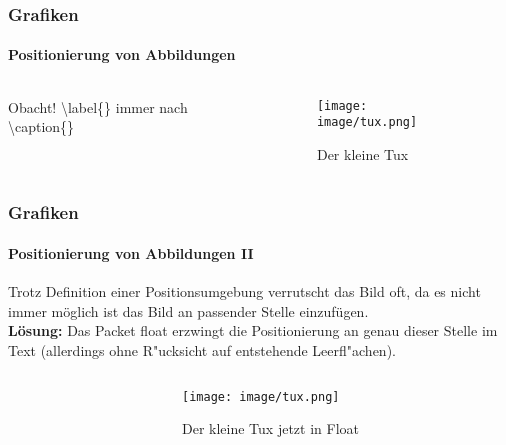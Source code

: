 
\begin{frame}
\frametitle{Grafiken}
\framesubtitle{Positionierung von Abbildungen}
\begin{columns}
\begin{column}{.5\textwidth}
{\ttfamily {\footnotesize
}}

\begin{alertblock}{Obacht!}
\color{nounibaredI}\textbackslash label\color{black}\{\} immer nach \color{nounibaredI}\textbackslash caption\color{black}\{\}
\end{alertblock}
\end{column}

\begin{column}{.5\textwidth} 
\begin{figure}
\begin{center}
    \texttt{[image: image/tux.png]}
\caption{Der kleine Tux}
\label{img:kleinertux}
\end{center}
\end{figure}
\end{column}
\end{columns}
\end{frame}


\begin{frame}[t]
\medskip
\frametitle{Grafiken}
\framesubtitle{Positionierung von Abbildungen II }
Trotz Definition einer Positionsumgebung verrutscht das Bild oft, da es nicht immer m\"oglich ist das Bild an passender Stelle einzufügen.\\
\textbf{L\"osung:} Das Packet {\ttfamily float} erzwingt die Positionierung an genau dieser Stelle im Text (allerdings ohne R"ucksicht auf entstehende Leerfl"achen).

\begin{columns}
\begin{column}{.5\textwidth}
{\ttfamily {\footnotesize
}}
\end{column}

\begin{column}{.5\textwidth} 
\begin{figure}
\begin{center}
    \texttt{[image: image/tux.png]}
\caption{Der kleine Tux jetzt in Float}
\label{img:kleinertux_float}
\end{center}
\end{figure}
\end{column}
\end{columns}

\end{frame}
